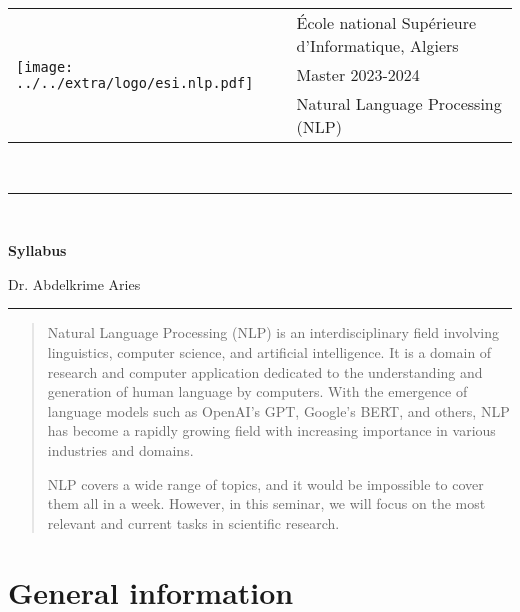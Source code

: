 \documentclass[11pt, a4paper]{article}
\begin{document}
\pagestyle{fancy}

\noindent
\begin{tabular}{ll}
\multirow{3}{*}{\texttt{[image: ../../extra/logo/esi.nlp.pdf]}} & \'Ecole national Supérieure d'Informatique, Algiers\\
& Master 2023-2024\\
& Natural Language Processing (NLP)
\end{tabular}\\[.25cm]
\noindent\rule{\textwidth}{1pt}\\[-0.25cm]
\begin{center}
{\LARGE \textbf{Syllabus}}
\begin{flushright}
	Dr. Abdelkrime Aries
\end{flushright}
\end{center}\vspace*{-0.25cm}
\noindent\rule{\textwidth}{1pt}

\begin{abstract}
	Natural Language Processing (NLP) is an interdisciplinary field involving linguistics, computer science, and artificial intelligence. 
	It is a domain of research and computer application dedicated to the understanding and generation of human language by computers. 
	With the emergence of language models such as OpenAI's GPT, Google's BERT, and others, NLP has become a rapidly growing field with increasing importance in various industries and domains.
	
	NLP covers a wide range of topics, and it would be impossible to cover them all in a week. 
	However, in this seminar, we will focus on the most relevant and current tasks in scientific research.
\end{abstract}

\section{General information}
\end{document}
